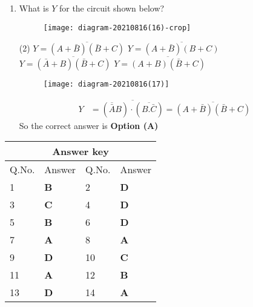 \begin{enumerate}
\begin{figure}[H]
\centering
\texttt{[image: diagram-20210816(11)-crop.pdf]}
\end{figure}
\begin{tasks}(4)
\task[\textbf{A.}] $1,0,1$
\task[\textbf{B.}] $0,0,1$
\task[\textbf{C.}] $1,1,1$
\task[\textbf{D.}] $0,1,1$
\end{tasks}
\begin{answer}
XOR is inequality comparator and XNOR is equality comparator. In AND gate output will be high when all the input is 1 .\\\\
So the correct answer is \textbf{Option (D)}
\end{answer}
	\item What is $Y$ for the circuit shown below?
\begin{figure}[H]
\centering
\texttt{[image: diagram-20210816(16)-crop]}
\caption{}
\label{}
\end{figure}
\begin{tasks}(2)
\task[\textbf{A.}] $Y=\overline{(A+\bar{B})(\bar{B}+C)}$
\task[\textbf{B.}]  $Y=\overline{(A+\bar{B})(B+C)}$
\task[\textbf{C.}] $Y=\overline{(\bar{A}+B)(\bar{B}+C)}$
\task[\textbf{D.}] $Y=\overline{(A+B)(\bar{B}+C)}$
\end{tasks}
\begin{answer}
\begin{figure}[H]
	\centering
	\texttt{[image: diagram-20210816(17)]}
\end{figure}
\begin{align*}
Y&=\overline{(\overline{\bar{A}} B) \cdot(\overline{B . \bar{C}})}=\overline{(A+\bar{B})(\bar{B}+C)}
\end{align*}
So the correct answer is \textbf{Option (A)}
\end{answer}
\end{enumerate}
\setlength\arrayrulewidth{1pt}
\begin{table}[H]
	\centering
	\begin{tabular}{|p{1.5cm}|p{1.5cm}||p{1.5cm}|p{1.5cm}|}
		\hline
		\multicolumn{4}{|c|}{\textbf{Answer key}}\\\hline\hline
		\rowcolor{ocrel}Q.No.&Answer&Q.No.&Answer\\\hline
		1&\textbf{B} &2&\textbf{D}\\\hline 
		3&\textbf{C} &4&\textbf{D} \\\hline
		5&\textbf{B} &6&\textbf{D} \\\hline
		7&\textbf{A}&8&\textbf{A}\\\hline
		9&\textbf{D}&10&\textbf{C}\\\hline
		11&\textbf{A} &12&\textbf{B}\\\hline
		13&\textbf{D}&14&\textbf{A}\\\hline
		
	\end{tabular}
\end{table}